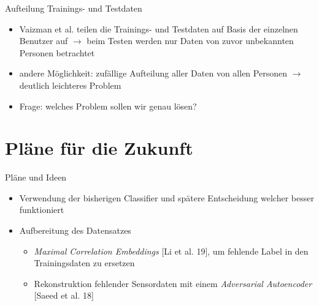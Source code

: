 \documentclass[10pt,%
	wide,%
	xcolor={x11names},%
	hyperref={colorlinks},%
	pantone312,%
	handout,%
	]{beamer}
\begin{document}
\begin{frame}[t]{Aufteilung Trainings- und Testdaten}
	\begin{itemize}
		\item Vaizman et al. teilen die Trainings- und Testdaten auf Basis der einzelnen Benutzer auf $\rightarrow$ beim Testen werden nur Daten von zuvor unbekannten Personen betrachtet
		\item andere Möglichkeit: zufällige Aufteilung aller Daten von allen Personen $\rightarrow$ deutlich leichteres Problem
		\item Frage: welches Problem sollen wir genau lösen?
	\end{itemize}
\end{frame}

\section{Pläne für die Zukunft}

\begin{frame}[t]{Pläne und Ideen}
	\begin{itemize}
		\item Verwendung der bisherigen Classifier und spätere Entscheidung welcher besser funktioniert
		\item Aufbereitung des Datensatzes
		\begin{itemize}
			\item \emph{Maximal Correlation Embeddings} [Li et al. 19], um fehlende Label in den Trainingsdaten zu ersetzen
			\item Rekonstruktion fehlender Sensordaten mit einem \emph{Adversarial Autoencoder} [Saeed et al. 18]
		\end{itemize}
	\end{itemize}
\end{frame}
\end{document}
